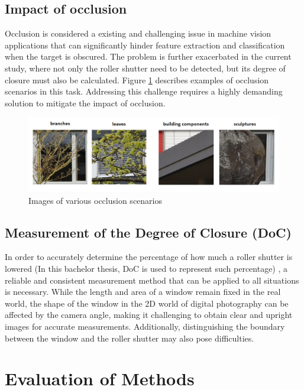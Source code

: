 \subsection{Impact of occlusion}

Occlusion is considered a existing and challenging issue in machine vision applications that can significantly hinder feature extraction and classification when the target is obscured. The problem is further exacerbated in the current study, where not only the roller shutter need to be detected, but its degree of closure must also be calculated. Figure \ref{fig:9} describes examples of occlusion scenarios in this task. Addressing this challenge requires a highly demanding solution to mitigate the impact of occlusion.

\begin{figure}[h]
  \centering
  \includegraphics[width=1\textwidth]{Figures/occlusion examples.png}
  \caption{Images of various occlusion scenarios}
  \label{fig:9}  
\end{figure}

\subsection{Measurement of the Degree of Closure (DoC)}

In order to accurately determine the percentage of how much a roller shutter is lowered (In this bachelor thesis, DoC is used to represent such percentage) , a reliable and consistent measurement method that can be applied to all situations is necessary. While the length and area of a window remain fixed in the real world, the shape of the window in the 2D world of digital photography can be affected by the camera angle, making it challenging to obtain clear and upright images for accurate measurements. Additionally, distinguishing the boundary between the window and the roller shutter may also pose difficulties.

\section{Evaluation of Methods}

